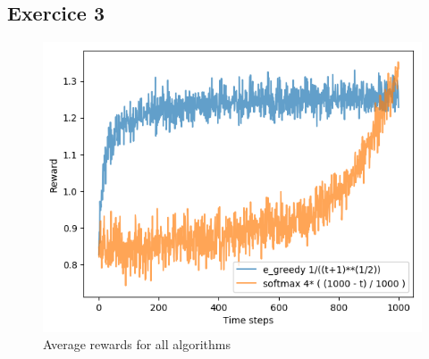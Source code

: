 \documentclass[letterpaper]{article}
\begin{document}
\subsection{Exercice 3}

\begin{figure}[H]
    \centering
    \includegraphics[width=.7\linewidth]{images/assign3/ex3/rewards}
    \caption{Average rewards for all algorithms}
    \label{fig:rewards_ex3}
\end{figure}
\end{document}
